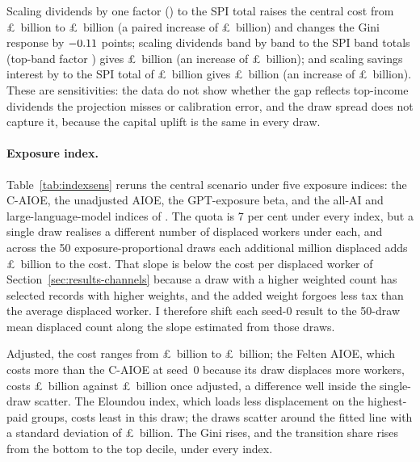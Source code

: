 Scaling dividends by one factor (\genDivScaleFactor) to the SPI total raises the central cost from \pounds\genDivCentralCostMeanBn~billion to \pounds\genCovDivUniformCostMeanBn~billion (a paired increase of \pounds\genCovDivUniformDiffCostAbsBn~billion) and changes the Gini response by $-0.11$ points; scaling dividends band by band to the SPI band totals (top-band factor \genDivTopBandFactor) gives \pounds\genCovDivBandedCostMeanBn~billion (an increase of \pounds\genCovDivBandedDiffCostAbsBn~billion); and scaling savings interest by \genSavScaleFactor{} to the SPI total of \pounds\genSavSpiBn~billion gives \pounds\genCovSavUniformCostMeanBn~billion (an increase of \pounds\genCovSavUniformDiffCostAbsBn~billion). These are sensitivities: the data do not show whether the gap reflects top-income dividends the projection misses or calibration error, and the draw spread does not capture it, because the capital uplift is the same in every draw.

\paragraph{Exposure index.} Table~\ref{tab:indexsens} reruns the central scenario under five exposure indices: the C-AIOE, the unadjusted \citet{felten2021} AIOE, the \citet{eloundou2023} GPT-exposure beta, and the all-AI and large-language-model indices of \citet{dsit2023}. The quota is 7 per cent under every index, but a single draw realises a different number of displaced workers under each, and across the 50 exposure-proportional draws each additional million displaced adds \pounds\genIndexSlopeCostBn~billion to the cost. That slope is below the cost per displaced worker of Section~\ref{sec:results-channels} because a draw with a higher weighted count has selected records with higher weights, and the added weight forgoes less tax than the average displaced worker. I therefore shift each seed-0 result to the 50-draw mean displaced count along the slope estimated from those draws.

Adjusted, the cost ranges from \pounds\genIndexAdjCostMinBn~billion to \pounds\genIndexAdjCostMaxBn~billion; the Felten AIOE, which costs more than the C-AIOE at seed~0 because its draw displaces more workers, costs \pounds\genIndexAdjFeltenCostBn~billion against \pounds\genIndexAdjCaioeCostBn~billion once adjusted, a difference well inside the single-draw scatter. The Eloundou index, which loads less displacement on the highest-paid groups, costs least in this draw; the draws scatter around the fitted line with a standard deviation of \pounds\genIndexSlopeResidSdBn~billion. The Gini rises, and the transition share rises from the bottom to the top decile, under every index.


